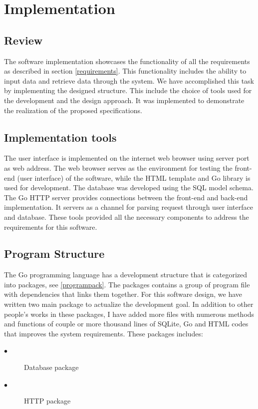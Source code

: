 \chapter{Implementation}
\label{chap:ch4_abbr}
\label{chap:figtab}
\section{Review}
The software implementation showcases the functionality of all the requirements as described in section \ref{requirements}. This functionality includes the ability to input data and retrieve data through the system. We have accomplished this task by implementing the designed structure. This include the choice of tools used for the development and the design approach. It was implemented to demonstrate the realization of the proposed specifications.
\section{Implementation tools}
The user interface is implemented on the internet web browser using server port as web address. The web browser serves as the environment for testing the front-end (user interface) of the software, while the HTML template and Go library is used for development. The database was developed using the SQL model schema. The Go HTTP server provides connections between the front-end and back-end implementation. It servers as a channel for parsing request through user interface and database. These tools provided all the necessary components to address the requirements for this software. 
\section{Program Structure} \label{Programstructure}
The Go programming language has a development structure that is categorized into packages, see \autoref{programpack}. The packages contains a group of program file with dependencies that links them together. For this software design, we have written two main package to actualize the development goal. In addition to other people's works in these packages, I have added more files with numerous methods and functions of couple or more thousand lines of SQLite, Go and HTML codes that improves the system requirements. These packages includes:
\begin{description}
\item[$\bullet$]Database package 
\item[$\bullet$]HTTP package 
\end{description}

